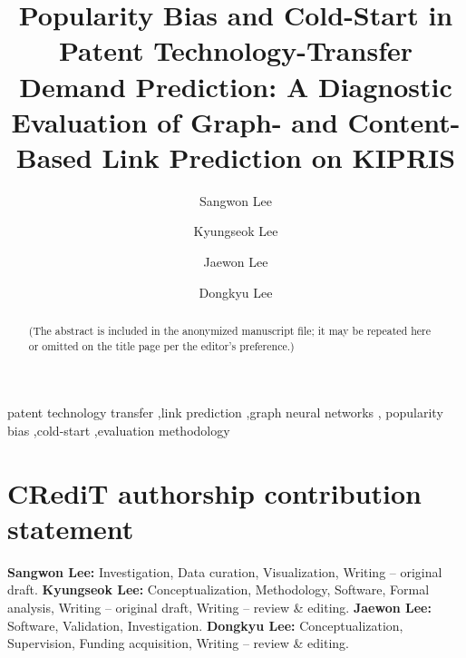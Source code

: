 \documentclass[preprint,12pt]{elsarticle}
\begin{document}
\begin{frontmatter}

\title{Popularity Bias and Cold-Start in Patent Technology-Transfer
Demand Prediction: A Diagnostic Evaluation of Graph- and Content-Based
Link Prediction on KIPRIS}

\author[hyis]{Sangwon Lee}
\author[hyme]{Kyungseok Lee}
\author[hyme]{Jaewon Lee}
\author[lg]{Dongkyu Lee}





\begin{abstract}
(The abstract is included in the anonymized manuscript file; it may be repeated
here or omitted on the title page per the editor's preference.)
\end{abstract}

\begin{keyword}
patent technology transfer \sep link prediction \sep graph neural networks \sep
popularity bias \sep cold-start \sep evaluation methodology
\end{keyword}

\end{frontmatter}

\section*{CRediT authorship contribution statement}
\textbf{Sangwon Lee:} Investigation, Data curation, Visualization,
Writing -- original draft.
\textbf{Kyungseok Lee:} Conceptualization, Methodology, Software, Formal analysis,
Writing -- original draft, Writing -- review \& editing.
\textbf{Jaewon Lee:} Software, Validation, Investigation.
\textbf{Dongkyu Lee:} Conceptualization, Supervision, Funding acquisition,
Writing -- review \& editing.
\end{document}
